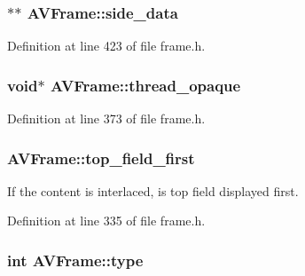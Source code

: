 \subsubsection[{\texorpdfstring{side\+\_\+data}{side_data}}]{$\ast$$\ast$ A\+V\+Frame\+::side\+\_\+data}\hypertarget{struct_a_v_frame_a44d40e03fe22a0511c9157dab22143ee}{}\label{struct_a_v_frame_a44d40e03fe22a0511c9157dab22143ee}


Definition at line 423 of file frame.\+h.

\subsubsection[{\texorpdfstring{thread\+\_\+opaque}{thread_opaque}}]{ {\bf void}$\ast$ A\+V\+Frame\+::thread\+\_\+opaque}\hypertarget{struct_a_v_frame_ae4a8ca2d431076c15418c9f3b2a8c6e6}{}\label{struct_a_v_frame_ae4a8ca2d431076c15418c9f3b2a8c6e6}


Definition at line 373 of file frame.\+h.

\subsubsection[{\texorpdfstring{top\+\_\+field\+\_\+first}{top_field_first}}]{ A\+V\+Frame\+::top\+\_\+field\+\_\+first}\hypertarget{struct_a_v_frame_a6f3ee0596312c90a2ef2ad160c991188}{}\label{struct_a_v_frame_a6f3ee0596312c90a2ef2ad160c991188}
If the content is interlaced, is top field displayed first. 

Definition at line 335 of file frame.\+h.

\subsubsection[{\texorpdfstring{type}{type}}]{ {\bf int} A\+V\+Frame\+::type}\hypertarget{struct_a_v_frame_af7143534e996c9c9863c1e3c8c5e59d9}{}\label{struct_a_v_frame_af7143534e996c9c9863c1e3c8c5e59d9}


